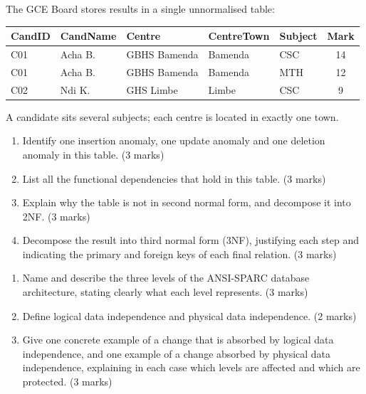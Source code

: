 \documentclass[11pt]{article}
\newcommand{\cle}[1]{{\popxbold\color{popdark}#1}}
\newcounter{popsec}
\newcounter{popsub}
\newcommand{\courssub}[1]{%
  \stepcounter{popsub}%
  \par\vspace{9pt}\noindent{\popxbold\fontsize{11.5}{13}\selectfont\color{popink}{\color{poporange}\thepopsec.\thepopsub}\hspace{6pt}#1}\par\nopagebreak\vspace{4pt}
}
\begin{document}
\courssub{I prepare for the GCE}

\begin{exercice}
The GCE Board stores results in a single unnormalised table:

\begin{center}
\begin{tabular}{|l|l|l|l|l|c|}
\hline
\rowcolor{popblueL} \textbf{CandID} & \textbf{CandName} & \textbf{Centre} & \textbf{CentreTown} & \textbf{Subject} & \textbf{Mark} \\
\hline
C01 & Acha B. & GBHS Bamenda & Bamenda & CSC & 14 \\
\hline
C01 & Acha B. & GBHS Bamenda & Bamenda & MTH & 12 \\
\hline
C02 & Ndi K. & GHS Limbe & Limbe & CSC & 9 \\
\hline
\end{tabular}
\end{center}

A candidate sits several subjects; each centre is located in exactly one town.
\begin{enumerate}
\item Identify one insertion anomaly, one update anomaly and one deletion anomaly in this table. \hfill (3 marks)
\item List all the functional dependencies that hold in this table. \hfill (3 marks)
\item Explain why the table is not in second normal form, and decompose it into 2NF. \hfill (3 marks)
\item Decompose the result into third normal form (3NF), justifying each step and indicating the primary and foreign keys of each final relation. \hfill (3 marks)
\end{enumerate}
\end{exercice}

\begin{exercice}
\begin{enumerate}
\item Name and describe the three levels of the ANSI-SPARC database architecture, stating clearly what each level represents. \hfill (3 marks)
\item Define \cle{logical data independence} and \cle{physical data independence}. \hfill (2 marks)
\item Give one concrete example of a change that is absorbed by logical data independence, and one example of a change absorbed by physical data independence, explaining in each case which levels are affected and which are protected. \hfill (3 marks)
\end{enumerate}
\end{exercice}
\end{document}
